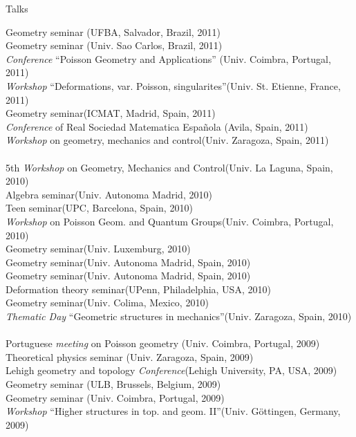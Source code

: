 \documentclass[12p]{resume}
\begin{document}
\begin{category}{Talks}
\begin{tabbing}
Geometry seminar \>(UFBA, Salvador, Brazil, 2011)\\
Geometry seminar \>(Univ. Sao Carlos, Brazil, 2011)\\
\emph{Conference} ``Poisson Geometry and Applications'' \>(Univ. Coimbra, Portugal, 2011)\\
\emph{Workshop} ``Deformations, var. Poisson, singularites''\>(Univ. St. Etienne, France, 2011)\\
Geometry seminar\>(ICMAT, Madrid, Spain, 2011)\\
\emph{Conference} of   Real Sociedad Matematica Espa\~nola  \>(Avila, Spain, 2011)\\
\emph{Workshop} on geometry, mechanics and control\>(Univ. Zaragoza, Spain, 2011)\\
\>\\

5th  \emph{Workshop} on Geometry, Mechanics and Control\>(Univ. La Laguna, Spain, 2010)\\
Algebra seminar\>(Univ. Autonoma Madrid, 2010)\\
Teen seminar\>(UPC, Barcelona,  Spain, 2010)\\
\emph{Workshop} on Poisson Geom. and Quantum Groups\>(Univ. Coimbra, Portugal, 2010)\\
Geometry seminar\>(Univ.  Luxemburg, 2010)\\
Geometry seminar\>(Univ. Autonoma Madrid, Spain, 2010)\\
Geometry seminar\>(Univ. Autonoma Madrid, Spain, 2010)\\
Deformation theory seminar\>(UPenn, Philadelphia, USA, 2010)\\
Geometry seminar\>(Univ. Colima, Mexico, 2010)\\
\emph{Thematic Day} ``Geometric structures in mechanics''\>(Univ. Zaragoza, Spain, 2010)\\
\> \\

Portuguese \emph{meeting} on Poisson geometry \>(Univ. Coimbra, Portugal, 2009)\\
Theoretical physics seminar \>(Univ. Zaragoza, Spain, 2009)\\
Lehigh geometry and topology \emph{Conference}\>(Lehigh University, PA, USA, 2009)\\
Geometry seminar \>(ULB, Brussels, Belgium, 2009)\\
Geometry seminar  \>(Univ. Coimbra, Portugal, 2009)\\
\emph{Workshop} ``Higher structures in top. and geom. II''\>(Univ. G\"ottingen, Germany, 2009)\\
\> \\


\end{tabbing}
\end{category}
\end{document}
